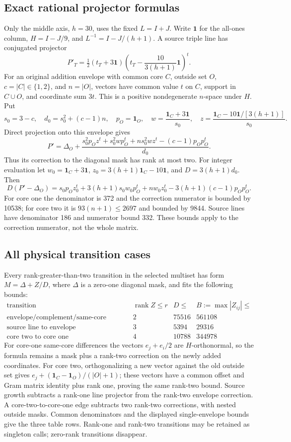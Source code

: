 \subsection{Exact rational projector formulas}
Only the middle axis, $h=30$, uses the fixed $L=I+J$.
Write $\mathbf1$ for the all-ones column, $H=I-J/9$, and
$L^{-1}=I-J/(h+1)$. A source triple line has conjugated projector
\[
 P'_T=\tfrac12(t_T+3\mathbf1)
       \left(t_T-\frac{10}{3(h+1)}\mathbf1\right)^t.
\]
For an original addition envelope with common core $C$, outside set $O$,
$c=|C|\in\{1,2\}$, and $n=|O|$, vectors have common value $t$ on
$C$, support in $C\cup O$, and coordinate sum $3t$. This is a
positive nondegenerate $n$-space under $H$. Put
\[
 s_0=3-c,\quad d_0=s_0^2+(c-1)n,\quad p_O=\mathbf1_O,\quad
 w=\frac{\mathbf1_C+3\mathbf1}{s_0},\quad
 z=\frac{\mathbf1_C-10\mathbf1/[3(h+1)]}{s_0}.
\]
Direct projection onto this envelope gives
\[
 P'=\Delta_O+
 \frac{s_0^2p_Oz^t+s_0^2wp_O^t+ns_0^2wz^t-(c-1)p_Op_O^t}{d_0}.
\]
Thus its correction to the diagonal mask has rank at most two.
For integer evaluation let $w_0=\mathbf1_C+3\mathbf1$,
$z_0=3(h+1)\mathbf1_C-10\mathbf1$, and $D=3(h+1)d_0$. Then
\[
 D(P'-\Delta_O)=s_0p_Oz_0^t+3(h+1)s_0w_0p_O^t
                  +nw_0z_0^t-3(h+1)(c-1)p_Op_O^t.
\]
For core one the denominator is 372 and the correction numerator is
bounded by 10538; for core two it is $93(n+1)\le2697$ and bounded
by 9844. Source lines have denominator 186 and numerator bound 332.
These bounds apply to the correction numerator, not the whole matrix.

\subsection{All physical transition cases}
Every rank-greater-than-two transition in the selected multiset has
form $M=\Delta+Z/D$, where $\Delta$ is a zero-one diagonal mask,
and fits the following bounds:
\[
\begin{array}{l|r|r|r}
\text{transition}&\operatorname{rank}Z\le r&D\le&B:=\max|Z_{ij}|\le\\\hline
\text{envelope/complement/same-core difference}&2&75516&561108\\
\text{source line to envelope}&3&5394&29316\\
\text{core two to core one}&4&10788&344978
\end{array}
\]
For core-one same-core differences the vectors
$e_j+e_i/2$ are $H$-orthonormal, so the formula remains a mask plus
a rank-two correction on the newly added coordinates. For core two,
orthogonalizing a new vector against the old outside set gives
$e_j+(\mathbf1_C-\mathbf1_O)/(|O|+1)$; these vectors have a common
offset and Gram matrix identity plus rank one, proving the same rank-two
bound. Source growth subtracts a rank-one line projector from the
rank-two envelope correction. A core-two-to-core-one edge subtracts
two rank-two corrections, with nested outside masks. Common denominators
and the displayed single-envelope bounds give the three table rows.
Rank-one and rank-two transitions may be retained as singleton calls;
zero-rank transitions disappear.

